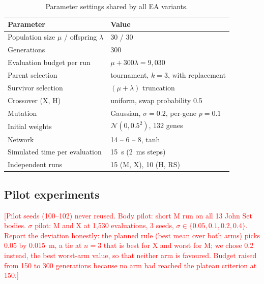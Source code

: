 \documentclass[sigconf,nonacm]{acmart}
\newcommand{\todo}[1]{\textcolor{red}{[#1]}}
\newcommand{\cfgM}{\textsf{M}}     %
\newcommand{\cfgX}{\textsf{X}}     %
\newcommand{\cfgH}{\textsf{H}}    %
\newcommand{\cfgRS}{\textsf{RS}}   %
\begin{document}
\begin{table}[t]
  \caption{Parameter settings shared by all EA variants.}
  \label{tab:params}
  \small
  \centering
  \begin{tabular}{@{}ll@{}}
    \toprule
    Parameter & Value \\
    \midrule
    Population size $\mu$ / offspring $\lambda$ & 30 / 30 \\
    Generations & 300 \\
    Evaluation budget per run & $\mu + 300\lambda = 9{,}030$ \\
    Parent selection & tournament, $k = 3$, with replacement \\
    Survivor selection & $(\mu+\lambda)$ truncation \\
    Crossover (\cfgX{}, \cfgH{}) & uniform, swap probability 0.5 \\
    Mutation & Gaussian, $\sigma = 0.2$, per-gene $p = 0.1$ \\
    Initial weights & $\mathcal{N}(0, 0.5^2)$, 132 genes \\
    Network & 14 -- 6 -- 8, tanh \\
    Simulated time per evaluation & 15~s (2~ms steps) \\
    Independent runs & 15 (\cfgM{}, \cfgX{}), 10 (\cfgH{}, \cfgRS{}) \\
    \bottomrule
  \end{tabular}
\end{table}

\subsection{Pilot experiments}
\todo{Pilot seeds (100--102) never reused. Body pilot: short \cfgM{} run on all 13 John Set bodies. $\sigma$ pilot: \cfgM{} and \cfgX{} at 1{,}530 evaluations, 3 seeds, $\sigma \in \{0.05, 0.1, 0.2, 0.4\}$. Report the deviation honestly: the planned rule (best mean over both arms) picks 0.05 by 0.015~m, a tie at $n = 3$ that is best for \cfgX{} and worst for \cfgM{}; we chose 0.2 instead, the best worst-arm value, so that neither arm is favoured. Budget raised from 150 to 300 generations because no arm had reached the plateau criterion at 150.}

\begin{table}[t]
  \caption{Pilot experiments. Left: the four best John Set bodies in a short mutation-only
  run (520 evaluations, 2 seeds, 2~m straight-ahead target; mean final distance in m).
  Right: mean final distance (m) of \cfgM{} and \cfgX{} after 1{,}530 evaluations (3 seeds)
  for each mutation step size, and of the worse of the two arms.}
  \label{tab:pilots}
  \small
  \centering
  
\end{table}
\end{document}
